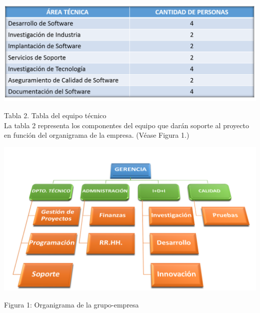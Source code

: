 \documentclass[11pt,letterpaper]{report}
\begin{document}
\begin{center}
\includegraphics[scale=0.6]{img/tabla_personal.png}
\end{center}

Tabla 2. Tabla del equipo técnico\\
La tabla 2 representa los componentes del equipo que darán soporte al proyecto en función del organigrama de la empresa. (Véase Figura 1.)

\begin{center}
\includegraphics[scale=0.75]{img/diagrama_jerarquico.png}
\end{center}
\begin{center}
Figura 1: Organigrama de la grupo-empresa
\end{center}
\end{document}
